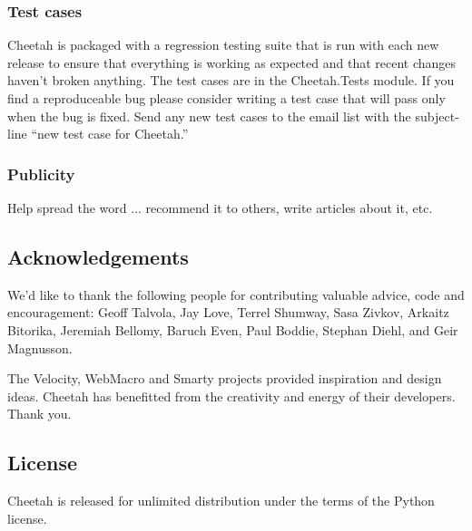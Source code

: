 \subsubsection{Test cases}
Cheetah is packaged with a regression testing suite that is run with each
new release to ensure that everything is working as expected and that recent
changes haven't broken anything.  The test cases are in the Cheetah.Tests
module.  If you find a reproduceable bug please consider writing a test case
that will pass only when the bug is fixed.  Send any new test cases to the email
list with the subject-line ``new test case for Cheetah.''

\subsubsection{Publicity}
Help spread the word ... recommend it to others, write articles about it, etc.

\subsection{Acknowledgements}
\label{intro.acknowledgments}
    
We'd like to thank the following people for contributing valuable advice, code
and encouragement: Geoff Talvola, Jay Love, Terrel Shumway, Sasa Zivkov, Arkaitz
Bitorika, Jeremiah Bellomy, Baruch Even, Paul Boddie, Stephan Diehl, and Geir
Magnusson.
    
The Velocity, WebMacro and Smarty projects provided inspiration and design
ideas.  Cheetah has benefitted from the creativity and energy of their
developers. Thank you.

\subsection{License}
\label{intro.license}

Cheetah is released for unlimited distribution under the terms of the
Python license.


